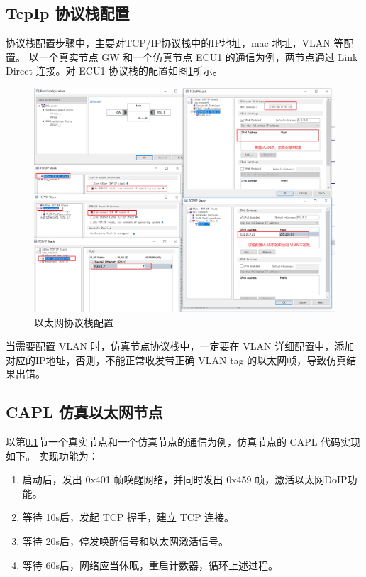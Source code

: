 \subsection{TcpIp 协议栈配置}\label{sec:two_node_comm}
协议栈配置步骤中，主要对TCP/IP协议栈中的IP地址，mac 地址，VLAN 等配置。
以一个真实节点 GW 和一个仿真节点 ECU1 的通信为例，两节点通过 Link Direct 连接。对 ECU1 协议栈的配置如图\ref{fig:tcpip_Configuration}所示。

\begin{figure}[!ht]
    \centering
    \includegraphics[scale=0.5]{pic/Snipaste_2021-10-29_16-08-23.png}
    \caption{以太网协议栈配置}
    \label{fig:tcpip_Configuration}
\end{figure}

\begin{note}
    当需要配置 VLAN 时，仿真节点协议栈中，一定要在 VLAN 详细配置中，添加对应的IP地址，否则，不能正常收发带正确 VLAN tag 的以太网帧，导致仿真结果出错。
\end{note}

\subsection{CAPL 仿真以太网节点}
以第\ref{sec:two_node_comm}节一个真实节点和一个仿真节点的通信为例，仿真节点的 CAPL 代码实现如下。
实现功能为：

\begin{enumerate}
    \item 启动后，发出 0x401 帧唤醒网络，并同时发出 0x459 帧，激活以太网DoIP功能。
    \item 等待 10s后，发起 TCP 握手，建立 TCP 连接。
    \item 等待 20s后，停发唤醒信号和以太网激活信号。
    \item 等待 60s后，网络应当休眠，重启计数器，循环上述过程。
\end{enumerate}

